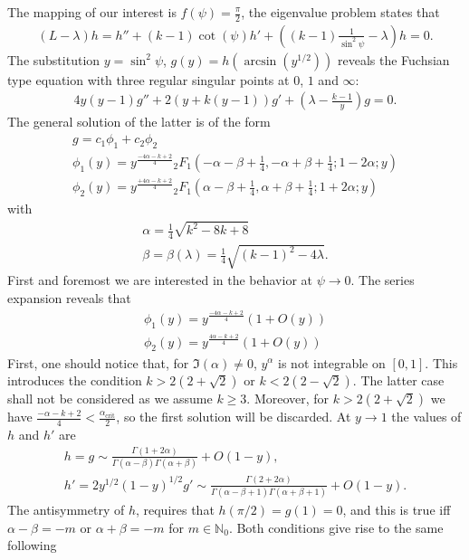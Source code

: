 The mapping of our interest is $f(\psi)=\frac{\pi}{2}$, the eigenvalue
problem states that
\begin{gather}\label{eq:problem}
  (L-\lambda)h=h''+(k-1)\cot(\psi)h'+((k-1)\frac{1}{\sin^2\psi}-\lambda)h=0.
\end{gather}
The substitution $y=\sin^2\psi$, $g(y)=h(\arcsin(y^{1/2}))$ reveals
the Fuchsian type equation with three regular singular points at $0$,
$1$ and $\infty$:
\begin{gather}
  4y(y-1)g''+2(y+k(y-1))g'+(\lambda-\frac{k-1}{y})g=0.
\end{gather}
The general solution of the latter is of the form
\begin{gather}
  g=c_1\phi_1+c_2\phi_2\\
  \phi_1(y)=y^{\frac{-4\alpha-k+2}{4}}{}_2F_1 (-\alpha-\beta+\frac{1}{4},-\alpha+\beta+\frac{1}{4};1-2\alpha;y)\\
  \phi_2(y)=y^{\frac{+4\alpha-k+2}{4}}{}_2F_1 (\alpha-\beta+\frac{1}{4},\alpha+\beta+\frac{1}{4};1+2\alpha;y)\label{eq:sol}
\end{gather}
with
\begin{gather}
  \alpha=\frac{1}{4}\sqrt{k^2-8 k+8}\\
  \beta=\beta(\lambda)=\frac{1}{4}\sqrt{(k-1)^2-4\lambda}.
\end{gather}
First and foremost we are interested in the behavior at
$\psi\rightarrow0$. The series expansion reveals that
\begin{gather}
  \phi_1(y)=y^{\frac{-4\alpha-k+2}{4}}(1+O(y))\\
  \phi_2(y)=y^{\frac{4\alpha-k+2}{4}}(1+O(y))
\end{gather}
First, one should notice that, for $\Im(\alpha)\ne0$, $y^\alpha$ is
not integrable on $[0,1]$. This introduces the condition
$k>2(2+\sqrt{2})$ or $k<2(2-\sqrt{2})$. The latter case shall not be
considered as we assume $k\ge3$. Moreover, for $k>2(2+\sqrt{2})$ we
have $\frac{-\alpha-k+2}{4}<\frac{\alpha_{\text{crit}}}{2}$, so the
first solution will be discarded. At $y\rightarrow1$ the values of $h$
and $h'$ are
\begin{gather}
  h=g\sim\frac{\Gamma(1+2\alpha)}{\Gamma(\alpha-\beta)\Gamma(\alpha+\beta)}+O(1-y),\\
  h'=2y^{1/2}(1-y)^{1/2}g'\sim\frac{\Gamma(2+2\alpha)}{\Gamma(\alpha-\beta+1)\Gamma(\alpha+\beta+1)}+O(1-y).
\end{gather}
The antisymmetry of $h$, requires that $h(\pi/2)=g(1)=0$, and this is true
iff $\alpha-\beta=-m$ or $\alpha+\beta=-m$ for
$m\in\mathbb{N}_0$. Both conditions give rise to the same following
